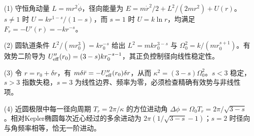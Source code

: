 (1) 守恒角动量 \(L=mr^2\dot\phi\)，径向能量为 \(E=m\dot r^2/2+L^2/(2mr^2)+U(r)\)。\(s\ne1\) 时 \(U=kr^{1-s}/(1-s)\)，而 \(s=1\) 时 \(U=k\ln r\)，均满足 \(F_r=-U'(r)=-kr^{-s}\)。

(2) 圆轨道条件 \(L^2/(mr_0^3)=kr_0^{-s}\) 给出 \(L^2=mkr_0^{3-s}\) 与 \(\Omega_0^2=k/(mr_0^{s+1})\)。有效势二阶导为 \(U_{\rm eff}''(r_0)=(3-s)kr_0^{-s-1}\)，其正负控制径向线性稳定性。

(3) 令 \(r=r_0+\delta r\)，有 \(m\delta\ddot r=-U_{\rm eff}''(r_0)\delta r\)，从而 \(\kappa^2=(3-s)\Omega_0^2\)。\(s<3\) 稳定，\(s>3\) 指数失稳，\(s=3\) 为线性边界、频率为零，必须检查精确有效势与非线性项。

(4) 近圆极限中每一径向周期 \(T_r=2\pi/\kappa\) 的方位进动角 \(\Delta\phi=\Omega_0T_r=2\pi/\sqrt{3-s}\)。相对Kepler椭圆每次近心经过的多余进动为 \(2\pi(1/\sqrt{3-s}-1)\)；\(s=2\) 时径向与角频率相等，恰无一阶进动。
